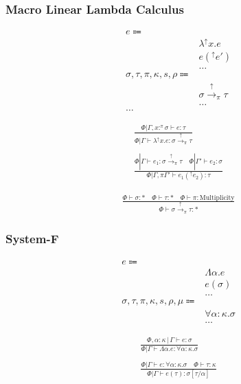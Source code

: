 \documentclass {article}
\begin{document}
\subsubsection{Macro Linear Lambda Calculus}
\begin{align*}
e \Coloneqq & \\
& \lambda^\uparrow x. e \tag{Macro Lambda}\\
& e(^\uparrow e') \tag{Macro Application}\\
& \dots \\
\sigma, \tau, \pi, \kappa, s, \rho \Coloneqq & \\
& \sigma \xrightarrow{\uparrow}_\pi \tau \tag{Macro} \\
& \dots \\
\dots
\end{align*}

\begin{gather*}
\frac
{\Phi | \Gamma, x :^\pi \sigma \vdash e : \tau}
{\Phi | \Gamma \vdash \lambda^\uparrow x. e : \sigma \xrightarrow{\uparrow}_\pi \tau } \\
\\
\frac
{\Phi | \Gamma \vdash e_1 : \sigma \xrightarrow{\uparrow}_\pi \tau \quad \Phi | \Gamma' \vdash e_2 : \sigma}
{\Phi | \Gamma, \pi \Gamma' \vdash e_1(^\uparrow e_2) : \tau}
\end{gather*}

\begin{gather*}
\frac
{\Phi \vdash \sigma : * \quad \Phi \vdash \tau : * \quad \Phi \vdash \pi : \text{Multiplicity}}
{\Phi \vdash \sigma \xrightarrow{\uparrow}_\pi \tau  : * }
\end{gather*}

\subsubsection{System-F}
\begin{align*}
e \Coloneqq & \\
& \Lambda \alpha. e \tag{Type Lambda} \\
& e (\sigma) \tag{Type Application} \\
& \dots \\
\sigma, \tau, \pi, \kappa, s, \rho, \mu \Coloneqq & \\
& \forall \alpha : \kappa. \sigma \tag{Type Poly}\\ 
& \dots
\end{align*}

\begin{gather*}
\frac
{\Phi, \alpha : \kappa \, | \, \Gamma \vdash e : \sigma}
{\Phi | \Gamma \vdash \Lambda \alpha. e : \forall \alpha : \kappa. \sigma } \\
\\
\frac
{\Phi | \Gamma \vdash e : \forall \alpha : \kappa. \sigma \quad \Phi \vdash \tau : \kappa}
{\Phi | \Gamma \vdash e (\tau) : \sigma [\tau/\alpha] }
\end{gather*}
\end{document}
